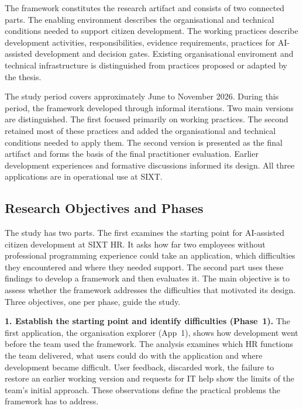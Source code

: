 \documentclass[10pt,a4paper]{article}
\begin{document}
The framework constitutes the research artifact and consists of
two connected parts. The enabling environment describes the
organisational and technical conditions needed to support citizen
development. The working practices describe development activities,
responsibilities, evidence requirements, practices for AI-assisted
development and decision gates. Existing organisational enviroment and technical infrastructure
is distinguished from practices proposed or adapted by the thesis.

The study period covers approximately June to November 2026.
During this period, the framework developed through informal
iterations. Two main versions are distinguished. The first focused
primarily on working practices. The second retained most of these
practices and added the organisational and technical conditions
needed to apply them. The second version is presented as the final
artifact and forms the basis of the final practitioner evaluation.
Earlier development experiences and formative discussions informed
its design. All three applications are in operational use at SIXT.

 
\subsection{Research Objectives and Phases}
\label{sec:method-phases}
 
The study has two parts. The first examines the starting point for
AI-assisted citizen development at SIXT HR. It asks how far two
employees without professional programming experience could take an
application, which difficulties they encountered and where they needed
support. The second part uses these findings to develop a framework and
then evaluates it. The main objective is to assess whether the framework
addresses the difficulties that motivated its design. Three objectives,
one per phase, guide the study.
 
\textbf{1. Establish the starting point and identify difficulties
(Phase~1).} The first application, the organisation explorer (App~1),
shows how development went before the team used the framework. The
analysis examines which HR functions the team delivered, what users
could do with the application and where development became difficult.
User feedback, discarded work, the failure to restore an earlier
working version and requests for IT help show the limits of the team's
initial approach. These observations define the practical problems the
framework has to address.
 
\end{document}
